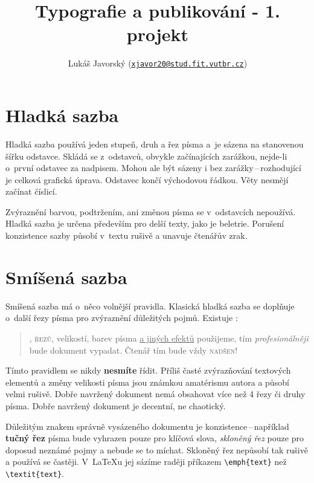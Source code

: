 \documentclass[a4paper,10pt,twocolumn]{article}
\title{Typografie a publikování - 1. projekt}
\author{Lukáš Javorský (\href{mailto:xjavor20@stud.fit.vutbr.cz}{\nolinkurl{xjavor20@stud.fit.vutbr.cz}})}
\date{}
\newcommand*{\pagfont}{\fontfamily{pag}\selectfont}
\begin{document}
\maketitle

\section{Hladká sazba}

Hladká sazba používá jeden stupeň, druh a řez písma a~je sázena na stanovenou šířku odstavce. Skládá se z~odstavců, obvykle začínajících zarážkou, nejde-li o~první odstavec za nadpisem. Mohou ale být sázeny i bez zarážky\,--\,rozhodující je celková grafická úprava. Odstavec končí východovou řádkou. Věty nesmějí začínat číslicí.

Zvýraznění barvou, podtržením, ani změnou písma se v~odstavcích nepoužívá. Hladká sazba je určena pře\-de\-vším pro delší texty, jako je beletrie. Porušení kon\-zis\-ten\-ce sazby působí v~textu rušivě a unavuje čtenářův zrak.

\section{Smíšená sazba}

Smíšená sazba má o~něco volnější pravidla. Klasická hladká sazba se doplňuje o~další řezy písma pro zvý\-raz\-ně\-ní důležitých pojmů. Existuje :

\begin{quotation}
{\large \pagfont {Čím více druhů}}, \textsc{řezů}, {\tiny velikostí}, barev písma \uline{a jiných efektů} použijeme, tím \textit {\large profesionálněji} bude dokument vypadat. Čtenář tím bude vždy \textsc{nadšen}!
\end{quotation}

{\footnotesize Tímto} pravidlem se nikdy \textbf{nesmíte} řídit. Příliš časté {\large zvýrazňování} textových elementů a změny velikosti {\huge písma} jsou známkou amatérismu autora a působí {\Huge velmi} rušivě. Dobře navržený dokument nemá obsahovat více než
4 řezy či druhy písma. Dobře na\-vr\-že\-ný dokument je decentní, ne chaotický.

Důležitým znakem správně vysázeného dokumentu je konzistence\,--\,například \textbf{tučný řez} písma bude vy\-hra\-zen pouze pro klíčová slova, \textit{skloněný řez} pouze pro doposud neznámé pojmy a nebude se to míchat. Skloněný řez nepůsobí tak rušivě a používá se častěji. V~\LaTeX u jej sázíme raději příkazem \verb|\emph{text}| než \verb|\textit{text}|.
\end{document}
